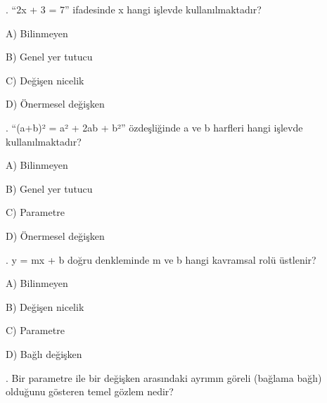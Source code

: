 \par\smallskip{}. “2x + 3 = 7” ifadesinde x hangi işlevde kullanılmaktadır?

\par\noindent\hspace*{1.6em}A) Bilinmeyen

\par\noindent\hspace*{1.6em}B) Genel yer tutucu

\par\noindent\hspace*{1.6em}C) Değişen nicelik

\par\noindent\hspace*{1.6em}D) Önermesel değişken

\par\smallskip{}. “(a+b)² = a² + 2ab + b²” özdeşliğinde a ve b harfleri hangi işlevde kullanılmaktadır?

\par\noindent\hspace*{1.6em}A) Bilinmeyen

\par\noindent\hspace*{1.6em}B) Genel yer tutucu

\par\noindent\hspace*{1.6em}C) Parametre

\par\noindent\hspace*{1.6em}D) Önermesel değişken

\par\smallskip{}. y = mx + b doğru denkleminde m ve b hangi kavramsal rolü üstlenir?

\par\noindent\hspace*{1.6em}A) Bilinmeyen

\par\noindent\hspace*{1.6em}B) Değişen nicelik

\par\noindent\hspace*{1.6em}C) Parametre

\par\noindent\hspace*{1.6em}D) Bağlı değişken

\par\smallskip{}. Bir parametre ile bir değişken arasındaki ayrımın göreli (bağlama bağlı) olduğunu gösteren temel gözlem nedir?


